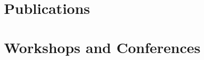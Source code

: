 \documentclass[10pt,a4paper,sans]{moderncv}
\begin{document}
\makecvtitle

\section{Publications}



\section{Workshops and Conferences}


\clearpage
\end{document}
